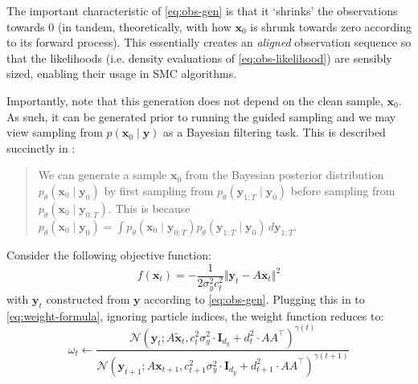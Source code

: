 \begin{remark}[Shrinking] \label{rem:shrinking}
    The important characteristic of \autoref{eq:obs-gen} is that it `shrinks' the
    observations towards 0 (in tandem, theoretically, with how $\mathbf{x}_0$
    is shrunk towards zero according to its forward process). This essentially creates an
    \emph{aligned} observation sequence so that the likelihoods (i.e. density evaluations of
    \autoref{eq:obs-likelihood}) are sensibly sized, enabling their usage in SMC algorithms.
\end{remark}

Importantly, note that this generation does not depend on the clean sample, $\mathbf{x}_0$. As such,
it can be generated prior to running the guided sampling and we may view sampling from
$p(\mathbf{x}_0 \mid \mathbf{y})$ as a Bayesian filtering task. This is described succinctly in
\textcite{douDiffusionPosteriorSampling2023}:
\begin{quote}
    We can generate a sample $\mathbf{x}_0$ from the Bayesian posterior distribution
    $p_\theta(\mathbf{x}_0 \mid \mathbf{y}_0)$ by first sampling from
    $p_\theta(\mathbf{y}_{1:T} \mid \mathbf{y}_0)$ before sampling from
    $p_\theta(\mathbf{x}_0 \mid \mathbf{y}_{0:T})$. This is because
    $p_\theta(\mathbf{x}_0 \mid \mathbf{y}_0) = \int p_\theta(\mathbf{x}_0 \mid \mathbf{y}_{0:T})p_\theta(\mathbf{y}_{1:T} \mid \mathbf{y}_0)\, d\mathbf{y}_{1:T}$.
\end{quote}

\begin{proposition}
    Consider the following objective function:
    \begin{equation}
        f(\mathbf{x}_t) = -\frac{1}{2\sigma_y^2c_t^2}\Vert\mathbf{y}_t - A\mathbf{x}_t\Vert^2 \label{eq:inverse-objective}
    \end{equation}
    with $\mathbf{y}_t$ constructed from $\mathbf{y}$ according to \autoref{eq:obs-gen}.
    Plugging this in to \autoref{eq:weight-formula}, ignoring particle indices, the weight function
    reduces to:
    \begin{equation}
        \omega_t \gets \frac{\mathcal{N}(\mathbf{y}_t; A\tilde{\mathbf{x}}_t, c_t^2\sigma_y^2\cdot \mathbf{I}_{d_y} + d_t^2\cdot AA^\top)^{\gamma(t)}}{\mathcal{N}(\mathbf{y}_{t+1}; A\mathbf{x}_{t+1}, c_{t+1}^2\sigma_y^2\cdot \mathbf{I}_{d_y} + d_{t+1}^2\cdot AA^\top)^{\gamma(t+1)}} \label{eq:weight-formula-inverse}
    \end{equation}
\end{proposition}

